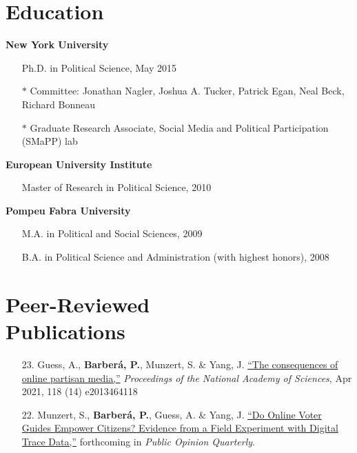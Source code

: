\documentclass[margin,line,11pt]{resume}
\begin{document}
\begin{resume}
    \section{\mysidestyle Education}
\textbf{New York University}
\begin{itemize}
\item[] Ph.D. in Political Science, May 2015
\vspace{-.15cm}
\item[] $\ast$ Committee: Jonathan Nagler, Joshua A. Tucker, Patrick Egan, Neal Beck, Richard Bonneau
\vspace{-.15cm}
\item[] $\ast$  Graduate Research Associate, Social Media and Political Participation (SMaPP) lab
\end{itemize}
\vspace{-.30cm}
\textbf{European University Institute} 
\begin{itemize}
\item[] Master of Research in Political Science, 2010
\end{itemize}
\vspace{-.30cm}
\textbf{Pompeu Fabra University} 
\begin{itemize}
\item[] M.A. in Political and Social Sciences, 2009
\vspace{-.15cm}
\item[] B.A. in Political Science and Administration (with highest honors), 2008 
\end{itemize}

    \section{\mysidestyle Peer-Reviewed\\Publications}
\vspace{.15cm}    
\begin{itemize}[leftmargin=5.5mm]

\item[23.] Guess, A., \textbf{Barber\'{a}, P.}, Munzert, S. \& Yang, J. \href{https://www.pnas.org/content/118/14/e2013464118}{``The consequences of online partisan media,''} \textit{Proceedings of the National Academy of Sciences}, Apr 2021, 118 (14) e2013464118

\item[22.] Munzert, S., \textbf{Barber\'{a}, P.}, Guess, A. \& Yang, J. \href{https://academic.oup.com/poq/advance-article/doi/10.1093/poq/nfaa037/6104133}{``Do Online Voter Guides Empower Citizens? Evidence from a Field Experiment with Digital Trace Data,''} forthcoming in \textit{Public Opinion Quarterly}.


\end{itemize}
\end{resume}
\end{document}
